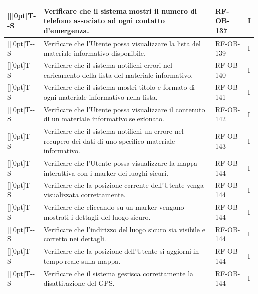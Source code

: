 \documentclass[a4paper,12pt]{article}
\newcounter{testsys}
\newcommand{\systestcode}{%
  \raisebox{0pt}[\height][0pt]{\hypertarget{T-\arabic{testsys}-S}{}}T-\arabic{testsys}-S%
}
\begin{document}
\begin{longtable}{| >{\centering\arraybackslash}p{} | >{\raggedright\arraybackslash}p{} | >{\centering\arraybackslash}p{} | >{\centering\arraybackslash}p{} |}
\stepcounter{testsys} \systestcode & Verificare che il sistema mostri il numero di telefono associato ad ogni contatto d'emergenza. & RF-OB-137 & I \\
\hline

\stepcounter{testsys} \systestcode & Verificare che l'Utente possa visualizzare la lista del materiale informativo disponibile. & RF-OB-139 & I \\
\hline

\stepcounter{testsys} \systestcode & Verificare che il sistema notifichi errori nel caricamento della lista del materiale informativo. & RF-OB-140 & I \\
\hline

\stepcounter{testsys} \systestcode & Verificare che il sistema mostri titolo e formato di ogni materiale informativo nella lista. & RF-OB-141 & I \\
\hline

\stepcounter{testsys} \systestcode & Verificare che l'Utente possa visualizzare il contenuto di un materiale informativo selezionato. & RF-OB-142 & I \\
\hline

\stepcounter{testsys} \systestcode & Verificare che il sistema notifichi un errore nel recupero dei dati di uno specifico materiale informativo. & RF-OB-143 & I \\
\hline

\stepcounter{testsys} \systestcode & Verificare che l'Utente possa visualizzare la mappa interattiva con i marker dei luoghi sicuri. & RF-OB-144 & I \\
\hline

\stepcounter{testsys} \systestcode & Verificare che la posizione corrente dell'Utente venga visualizzata correttamente. & RF-OB-144 & I \\
\hline

\stepcounter{testsys} \systestcode & Verificare che cliccando su un marker vengano mostrati i dettagli del luogo sicuro. & RF-OB-144 & I \\
\hline

\stepcounter{testsys} \systestcode & Verificare che l'indirizzo del luogo sicuro sia visibile e corretto nei dettagli. & RF-OB-144 & I \\
\hline

\stepcounter{testsys} \systestcode & Verificare che la posizione dell'Utente si aggiorni in tempo reale sulla mappa. & RF-OB-144 & I \\
\hline

\stepcounter{testsys} \systestcode & Verificare che il sistema gestisca correttamente la disattivazione del GPS. & RF-OB-144 & I \\
\hline


\end{longtable}
\end{document}
